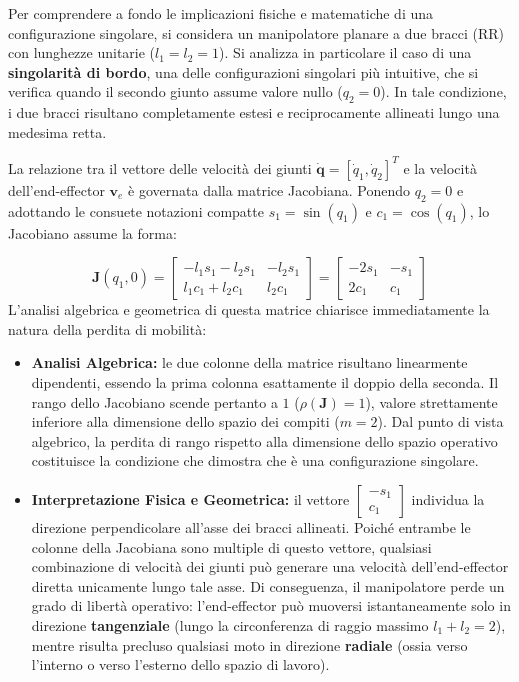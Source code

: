 \documentclass[11pt, a4paper]{report}
\begin{document}
\hfill
\begin{minipage}[c]{0.48\textwidth}
Per comprendere a fondo le implicazioni fisiche e matematiche di una configurazione singolare, si considera un manipolatore planare a due bracci (RR) con lunghezze unitarie ($l_1 = l_2 = 1$). Si analizza in particolare il caso di una \textbf{singolarità di bordo}, una delle configurazioni singolari più intuitive, che si verifica quando il secondo giunto assume valore nullo ($q_2 = 0$). In tale condizione, i due bracci risultano completamente estesi e reciprocamente allineati lungo una medesima retta.

La relazione tra il vettore delle velocità dei giunti $\dot{\bm{q}} = [\dot{q}_1, \dot{q}_2]^T$ e la velocità dell'end-effector $\bm{v}_e$ è governata dalla matrice Jacobiana. Ponendo $q_2 = 0$ e adottando le consuete notazioni compatte $s_1 = \sin(q_1)$ e $c_1 = \cos(q_1)$, lo Jacobiano assume la forma:
\end{minipage}
\[
    \bm{J}(q_1, 0) = \begin{bmatrix} -l_1s_1 - l_2s_1 & -l_2s_1 \\ l_1c_1 + l_2c_1 & l_2c_1 \end{bmatrix} = \begin{bmatrix} -2s_1 & -s_1 \\ 2c_1 & c_1 \end{bmatrix}
\]
L'analisi algebrica e geometrica di questa matrice chiarisce immediatamente la natura della perdita di mobilità:
\begin{itemize}
    \item \textbf{Analisi Algebrica:} le due colonne della matrice risultano linearmente dipendenti, essendo la prima colonna esattamente il doppio della seconda. Il rango dello Jacobiano scende pertanto a $1$ ($\rho(\bm{J}) = 1$), valore strettamente inferiore alla dimensione dello spazio dei compiti ($m = 2$). Dal punto di vista algebrico, la perdita di rango rispetto alla dimensione dello spazio operativo costituisce la condizione che dimostra che è una configurazione singolare.

    \item \textbf{Interpretazione Fisica e Geometrica:} il vettore $\begin{bmatrix}-s_1 \\ c_1\end{bmatrix}$ individua la direzione perpendicolare all'asse dei bracci allineati. Poiché entrambe le colonne della Jacobiana sono multiple di questo vettore, qualsiasi combinazione di velocità dei giunti può generare una velocità dell'end-effector diretta unicamente lungo tale asse. Di conseguenza, il manipolatore perde un grado di libertà operativo: l'end-effector può muoversi istantaneamente solo in direzione \textbf{tangenziale} (lungo la circonferenza di raggio massimo $l_1 + l_2 = 2$), mentre risulta precluso qualsiasi moto in direzione \textbf{radiale} (ossia verso l'interno o verso l'esterno dello spazio di lavoro).
\end{itemize}
\end{document}
